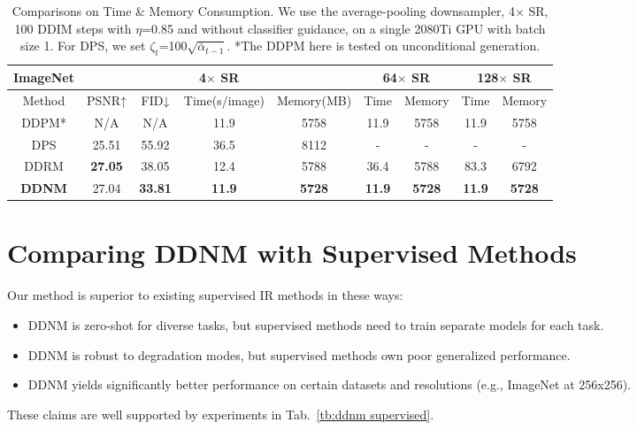 \documentclass{article} \usepackage{iclr2023_conference,times}
\begin{document}
\begin{table*}[h]
\scriptsize
\centering
    \begin{tabular}{c | cccc | cc| cc}
    \hline
           \multicolumn{1}{c}{\rule{0pt}{8pt}\tiny\textbf{ImageNet}}&\multicolumn{4}{|c}{4$\times$ SR} &\multicolumn{2}{|c}{64$\times$ SR}&\multicolumn{2}{|c}{128$\times$ SR}\\
        \hline
           \rule{0pt}{8pt}Method& PSNR↑&FID↓ & Time(s/image) & Memory(MB)& Time & Memory & Time & Memory \\
        \hline
            \rule{0pt}{8pt}{DDPM*} &N/A&N/A &11.9&5758&11.9&5758&11.9&5758\\
            \rule{0pt}{8pt}{DPS} &25.51&55.92 &36.5&8112 &-&-&-&-\\
            \rule{0pt}{8pt}{DDRM} &\textbf{27.05}&38.05 &12.4&5788 &36.4&5788&83.3&6792\\
            \rule{0pt}{8pt}{\textbf{DDNM}} & 27.04&\textbf{33.81}&\textbf{11.9}& \textbf{5728}&\textbf{11.9}& \textbf{5728}&\textbf{11.9}& \textbf{5728}\\
        \hline
    \end{tabular}
    \caption{Comparisons on Time \& Memory Consumption. We use the average-pooling downsampler, 4$\times$ SR, 100 DDIM steps with $\eta$=0.85 and without classifier guidance, on a single 2080Ti GPU with batch size 1. For DPS, we set $\zeta_t$=100$\sqrt{\bar{\alpha}_{t-1}}$. *The DDPM here is tested on unconditional generation.}
    \label{tb:ddnm time and memory}
\end{table*}

\section{Comparing DDNM with Supervised Methods}
\label{ap: compare supervised}
Our method is superior to existing supervised IR methods \citep{zhang2021designing,liang2021swinir} in these ways:
\begin{itemize}
\item DDNM is zero-shot for diverse tasks, but supervised methods need to train separate models for each task.
\item DDNM is robust to degradation modes, but supervised methods own poor generalized performance.
\item DDNM yields significantly better performance on certain datasets and resolutions (e.g., ImageNet at 256x256).
\end{itemize}
These claims are well supported by experiments in Tab.~\ref{tb:ddnm supervised}.
\end{document}
